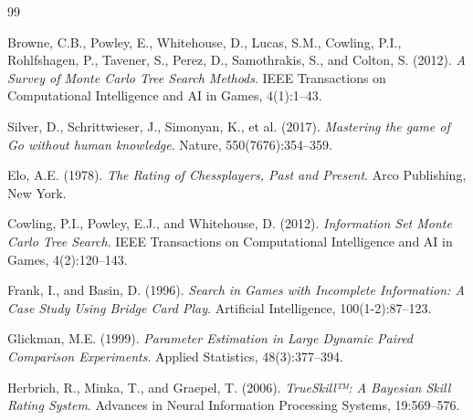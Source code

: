 \documentclass[11pt,letterpaper]{article}
\begin{document}




\begin{thebibliography}{99}


Browne, C.B., Powley, E., Whitehouse, D., Lucas, S.M., Cowling, P.I., Rohlfshagen, P., Tavener, S., Perez, D., Samothrakis, S., and Colton, S. (2012).
\textit{A Survey of Monte Carlo Tree Search Methods}.
IEEE Transactions on Computational Intelligence and AI in Games, 4(1):1--43.

Silver, D., Schrittwieser, J., Simonyan, K., et al. (2017).
\textit{Mastering the game of Go without human knowledge}.
Nature, 550(7676):354--359.

Elo, A.E. (1978).
\textit{The Rating of Chessplayers, Past and Present}.
Arco Publishing, New York.

Cowling, P.I., Powley, E.J., and Whitehouse, D. (2012).
\textit{Information Set Monte Carlo Tree Search}.
IEEE Transactions on Computational Intelligence and AI in Games, 4(2):120--143.

Frank, I., and Basin, D. (1996).
\textit{Search in Games with Incomplete Information: A Case Study Using Bridge Card Play}.
Artificial Intelligence, 100(1-2):87--123.

Glickman, M.E. (1999).
\textit{Parameter Estimation in Large Dynamic Paired Comparison Experiments}.
Applied Statistics, 48(3):377--394.

Herbrich, R., Minka, T., and Graepel, T. (2006).
\textit{TrueSkill™: A Bayesian Skill Rating System}.
Advances in Neural Information Processing Systems, 19:569--576.


\end{thebibliography}
\end{document}

